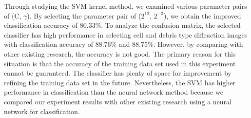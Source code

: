 Through studying the SVM kernel method, we examined various parameter pairs of (C, $\gamma$). By selecting the parameter pair of ($2^{12}$, $2^{-3}$), we obtain the improved classification  accuracy of 80.33\%. To analyze the confusion matrix, the selected classifier has high performance in selecting cell and debris type diffraction images with classification accuracy of 88.76\% and 88.75\%. However, by comparing with other existing research\cite{Rakesh}, the accuracy is not good. The primary reason for this situation is that the accuracy of the training data set used in this experiment cannot be guaranteed. The classifier has plenty of space for improvement by refining the training data set in the future. Nevertheless, the SVM has higher performance in classification than the neural network method because we compared our experiment results with other existing research using a neural network for classification\cite{Qayyum}. \par


